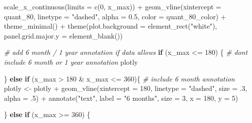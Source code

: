 \documentclass[
  11 pt,
  openany]{book}
\newenvironment{Shaded}{\begin{snugshade}}{\end{snugshade}}
\newcommand{\AttributeTok}[1]{\textcolor[rgb]{0.77,0.63,0.00}{#1}}
\newcommand{\CommentTok}[1]{\textcolor[rgb]{0.56,0.35,0.01}{\textit{#1}}}
\newcommand{\ControlFlowTok}[1]{\textcolor[rgb]{0.13,0.29,0.53}{\textbf{#1}}}
\newcommand{\DecValTok}[1]{\textcolor[rgb]{0.00,0.00,0.81}{#1}}
\newcommand{\FloatTok}[1]{\textcolor[rgb]{0.00,0.00,0.81}{#1}}
\newcommand{\FunctionTok}[1]{\textcolor[rgb]{0.00,0.00,0.00}{#1}}
\newcommand{\NormalTok}[1]{#1}
\newcommand{\OtherTok}[1]{\textcolor[rgb]{0.56,0.35,0.01}{#1}}
\newcommand{\SpecialCharTok}[1]{\textcolor[rgb]{0.00,0.00,0.00}{#1}}
\newcommand{\StringTok}[1]{\textcolor[rgb]{0.31,0.60,0.02}{#1}}
\begin{document}
\begin{Shaded}
\begin{Highlighting}[]
  \FunctionTok{scale\_x\_continuous}\NormalTok{(}\AttributeTok{limits =} \FunctionTok{c}\NormalTok{(}\DecValTok{0}\NormalTok{, x\_max)) }\SpecialCharTok{+}
  \FunctionTok{geom\_vline}\NormalTok{(}\AttributeTok{xintercept =}\NormalTok{ quant\_80,}
             \AttributeTok{linetype =} \StringTok{"dashed"}\NormalTok{, }\AttributeTok{alpha =} \FloatTok{0.5}\NormalTok{, }\AttributeTok{color =}\NormalTok{ quant\_80\_color) }\SpecialCharTok{+}
  \FunctionTok{theme\_minimal}\NormalTok{() }\SpecialCharTok{+}
  \FunctionTok{theme}\NormalTok{(}\AttributeTok{plot.background =} \FunctionTok{element\_rect}\NormalTok{(}\StringTok{"white"}\NormalTok{),}
        \AttributeTok{panel.grid.major.y =} \FunctionTok{element\_blank}\NormalTok{())}

\CommentTok{\# add 6 month / 1 year annotation if data allows}
\ControlFlowTok{if}\NormalTok{ (x\_max }\SpecialCharTok{\textless{}=} \DecValTok{180}\NormalTok{) \{}
  \CommentTok{\# don\textquotesingle{}t include 6 month or 1 year annotation}
\NormalTok{  plotly}
  
\NormalTok{\} }\ControlFlowTok{else} \ControlFlowTok{if}\NormalTok{ (x\_max }\SpecialCharTok{\textgreater{}} \DecValTok{180} \SpecialCharTok{\&}\NormalTok{ x\_max }\SpecialCharTok{\textless{}=} \DecValTok{360}\NormalTok{)\{}
  \CommentTok{\# include 6 month annotation}
\NormalTok{  plotly }\OtherTok{\textless{}{-}}\NormalTok{ plotly }\SpecialCharTok{+}
    \FunctionTok{geom\_vline}\NormalTok{(}\AttributeTok{xintercept =} \DecValTok{180}\NormalTok{, }
               \AttributeTok{linetype =} \StringTok{"dashed"}\NormalTok{, }\AttributeTok{size =}\NormalTok{ .}\DecValTok{3}\NormalTok{, }\AttributeTok{alpha =}\NormalTok{ .}\DecValTok{5}\NormalTok{) }\SpecialCharTok{+}
    \FunctionTok{annotate}\NormalTok{(}\StringTok{"text"}\NormalTok{, }\AttributeTok{label =} \StringTok{"6 months"}\NormalTok{,  }\AttributeTok{size =} \DecValTok{3}\NormalTok{,}
             \AttributeTok{x =} \DecValTok{180}\NormalTok{, }\AttributeTok{y =} \DecValTok{5}\NormalTok{)}
  
\NormalTok{\} }\ControlFlowTok{else} \ControlFlowTok{if}\NormalTok{ (x\_max }\SpecialCharTok{\textgreater{}=} \DecValTok{360}\NormalTok{) \{}
  

\end{Highlighting}
\end{Shaded}
\end{document}
